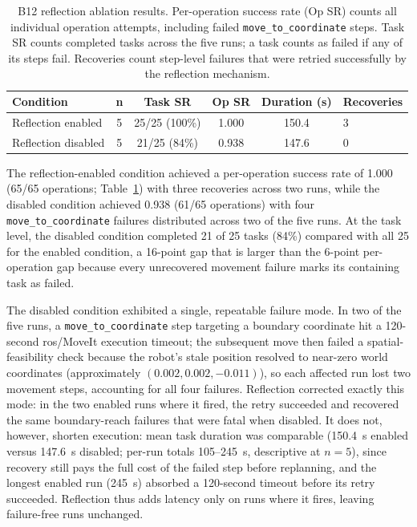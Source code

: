 \documentclass[
     12pt,
     a4paper,
     BCOR=10mm,
     DIV=14,
     listof=totoc,
     bibliography=totoc,
     parskip,
     twoside,
     headsepline
     ]{scrreprt}
\begin{document}
\begin{table}[ht]

	\begin{tabular}{lccccl}

		\hline

		\textbf{Condition}  & \textbf{n}            & \textbf{Task SR}    &

		\textbf{Op SR}      & \textbf{Duration (s)} & \textbf{Recoveries}                     \\

		\hline

		Reflection enabled  & 5                     & 25/25 (100\%)       & 1.000 & 150.4 & 3 \\

		Reflection disabled & 5                     & 21/25 (84\%)        & 0.938 & 147.6 & 0 \\

		\hline
	\end{tabular}

	\caption{B12 reflection ablation results. Per-operation success rate (Op SR) counts all individual operation attempts, including failed \texttt{move\_to\_coordinate} steps. Task SR counts completed tasks across the five runs; a task counts as failed if any of its steps fail. Recoveries count step-level failures that were retried successfully by the reflection mechanism.}

	\label{tab:b12-results}

\end{table}

The reflection-enabled condition achieved a per-operation success rate of 1.000 (65/65 operations; Table~\ref{tab:b12-results}) with three recoveries across two runs, while the disabled condition achieved 0.938 (61/65 operations) with four \texttt{move\_to\_coordinate} failures distributed across two of the five runs. At the task level, the disabled condition completed 21 of 25 tasks (84\%) compared with all 25 for the enabled condition, a 16-point gap that is larger than the 6-point per-operation gap because every unrecovered movement failure marks its containing task as failed.

The disabled condition exhibited a single, repeatable failure mode. In two of the five runs, a \texttt{move\_to\_coordinate} step targeting a boundary coordinate hit a 120-second \gls{ros}/MoveIt execution timeout; the subsequent move then failed a spatial-feasibility check because the robot's stale position resolved to near-zero world coordinates (approximately $(0.002, 0.002, -0.011)$), so each affected run lost two movement steps, accounting for all four failures. Reflection corrected exactly this mode: in the two enabled runs where it fired, the retry succeeded and recovered the same boundary-reach failures that were fatal when disabled. It does not, however, shorten execution: mean task duration was comparable (150.4~s enabled versus 147.6~s disabled; per-run totals 105--245~s, descriptive at $n=5$), since recovery still pays the full cost of the failed step before replanning, and the longest enabled run (245~s) absorbed a 120-second timeout before its retry succeeded. Reflection thus adds latency only on runs where it fires, leaving failure-free runs unchanged.
\end{document}
